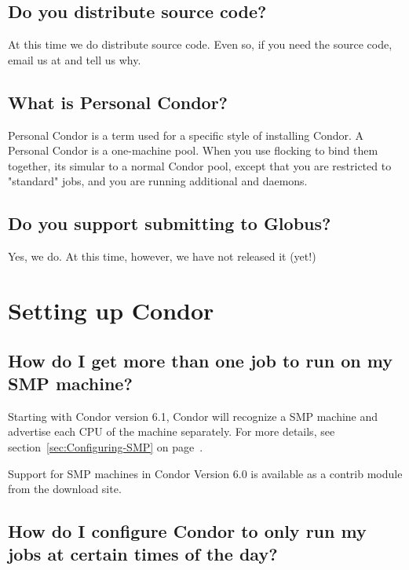 \subsection{Do you distribute source code?}

At this time we do  distribute source code.
Even so, if you need the source code, email us at  and tell us why.

\subsection{What is Personal Condor?}

Personal Condor is a term used for a specific style of installing Condor.
A Personal Condor is a one-machine pool.  When you use flocking to bind
them together, its simular to a normal Condor pool, except that you are restricted
to "standard" jobs, and you are running additional  and  
daemons.

\subsection{Do you support submitting to Globus?}

Yes, we do.  At this time, however, we have not released it (yet!)



\section{Setting up Condor}


\subsection{How do I get more than one job to run on my SMP machine?}

Starting with Condor version 6.1, Condor will recognize a SMP machine and advertise each CPU of the
machine separately.  For more details, see section~\ref{sec:Configuring-SMP} on page~\pageref{sec:Configuring-SMP}.

Support for SMP machines in Condor Version 6.0 is available as a contrib module from the download site.

\subsection{How do I configure Condor to only run my jobs at certain times of the day?}

